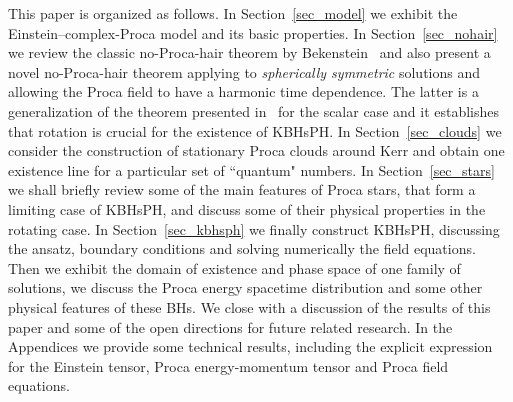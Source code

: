 \documentclass{article}
\numberwithin{equation}{section}
\begin{document}
\bigskip

This paper is organized as follows. In Section~\ref{sec_model} we exhibit the Einstein--complex-Proca model and its basic properties. In Section~\ref{sec_nohair} we review the classic no-Proca-hair theorem by Bekenstein~\cite{Bekenstein:1971hc,Bekenstein:1972ky} and also present a novel no-Proca-hair theorem applying to \textit{spherically symmetric} solutions and allowing the Proca field to have a harmonic time dependence. The latter is a generalization of the theorem presented in~\cite{Pena:1997cy} for the scalar case and it establishes that rotation is crucial for the existence of KBHsPH. In Section~\ref{sec_clouds} we consider the construction of stationary Proca clouds around Kerr and obtain one existence line for a particular set of ``quantum" numbers. In Section~\ref{sec_stars} we shall briefly review some of the main features of Proca stars, that form a limiting case of KBHsPH, and discuss some of their physical properties in the rotating case. In Section~\ref{sec_kbhsph} we finally construct KBHsPH, discussing the ansatz, boundary conditions and solving numerically the field equations. Then we exhibit the domain of existence and phase space of one family of solutions, we discuss the Proca energy spacetime distribution and some other physical features of these BHs. We close with a discussion of the results of this paper and some of the open directions for future related research.  In the Appendices we provide some technical results, including the explicit expression for the Einstein tensor, Proca energy-momentum tensor and Proca field equations.







\end{document}
